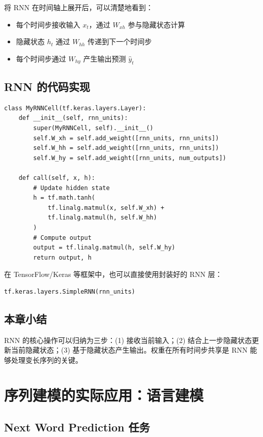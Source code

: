 \documentclass[a4paper]{article}
\begin{document}
将 RNN 在时间轴上展开后，可以清楚地看到：
\begin{itemize}
    \item 每个时间步接收输入 $x_t$，通过 $W_{xh}$ 参与隐藏状态计算
    \item 隐藏状态 $h_t$ 通过 $W_{hh}$ 传递到下一个时间步
    \item 每个时间步通过 $W_{hy}$ 产生输出预测 $\hat{y}_t$
\end{itemize}

\subsection{RNN 的代码实现}

\begin{lstlisting}[caption={基于 TensorFlow 的 RNN 层实现}]
class MyRNNCell(tf.keras.layers.Layer):
    def __init__(self, rnn_units):
        super(MyRNNCell, self).__init__()
        self.W_xh = self.add_weight([rnn_units, rnn_units])
        self.W_hh = self.add_weight([rnn_units, rnn_units])
        self.W_hy = self.add_weight([rnn_units, num_outputs])

    def call(self, x, h):
        # Update hidden state
        h = tf.math.tanh(
            tf.linalg.matmul(x, self.W_xh) +
            tf.linalg.matmul(h, self.W_hh)
        )
        # Compute output
        output = tf.linalg.matmul(h, self.W_hy)
        return output, h
\end{lstlisting}

在 TensorFlow/Keras 等框架中，也可以直接使用封装好的 RNN 层：

\begin{lstlisting}[caption={使用 Keras 封装的 SimpleRNN 层}]
tf.keras.layers.SimpleRNN(rnn_units)
\end{lstlisting}

\subsection{本章小结}

RNN 的核心操作可以归纳为三步：(1) 接收当前输入；(2) 结合上一步隐藏状态更新当前隐藏状态；(3) 基于隐藏状态产生输出。权重在所有时间步共享是 RNN 能够处理变长序列的关键。

\newpage
\section{序列建模的实际应用：语言建模}

\subsection{Next Word Prediction 任务}
\end{document}
